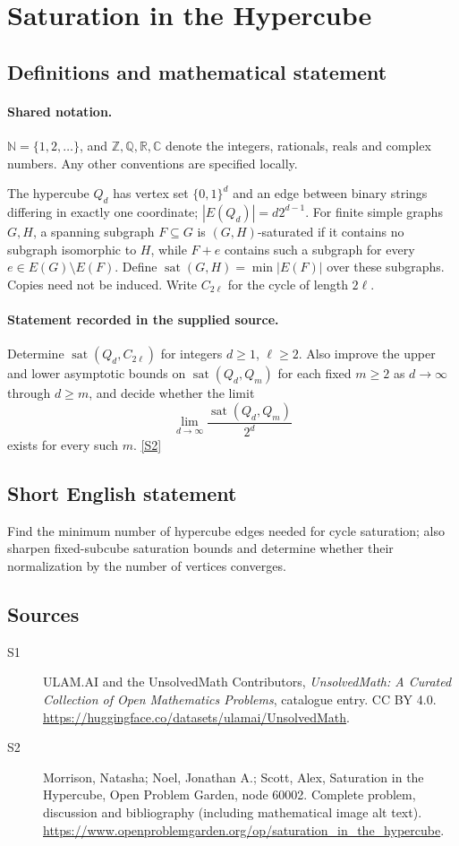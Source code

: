 \documentclass[11pt]{book}
\newcommand{\sref}[2]{\hyperlink{source:#1:#2}{[S#2]}}
\begin{document}
\section{Saturation in the Hypercube}\label{statement}

\subsection{Definitions and mathematical statement}

\paragraph{Shared notation.}$\mathbb N=\{1,2,\ldots\}$, and $\mathbb Z,\mathbb Q,\mathbb R,\mathbb C$ denote the integers, rationals, reals and complex numbers. Any other conventions are specified locally.


The hypercube $Q_d$ has vertex set $\{0,1\}^d$ and an edge between binary strings differing in exactly one coordinate; $|E(Q_d)|=d2^{d-1}$. For finite simple graphs $G,H$, a spanning subgraph $F\subseteq G$ is $(G,H)$-saturated if it contains no subgraph isomorphic to $H$, while $F+e$ contains such a subgraph for every $e\in E(G)\setminus E(F)$. Define $\operatorname{sat}(G,H)=\min |E(F)|$ over these subgraphs. Copies need not be induced. Write $C_{2\ell}$ for the cycle of length $2\ell$.
\paragraph{Statement recorded in the supplied source.}
Determine $\operatorname{sat}(Q_d,C_{2\ell})$ for integers $d\geq1$, $\ell\geq2$. Also improve the upper and lower asymptotic bounds on $\operatorname{sat}(Q_d,Q_m)$ for each fixed $m\geq2$ as $d\to\infty$ through $d\geq m$, and decide whether the limit
\[\lim_{d\to\infty}\frac{\operatorname{sat}(Q_d,Q_m)}{2^d}\]
exists for every such $m$. \sref{statement}{2}
\subsection{Short English statement}
Find the minimum number of hypercube edges needed for cycle saturation; also sharpen fixed-subcube saturation bounds and determine whether their normalization by the number of vertices converges.
\subsection{Sources}
\begin{description}
\item[\hypertarget{source:statement:1}{S1}] ULAM.AI and the UnsolvedMath Contributors, \emph{UnsolvedMath: A Curated Collection of Open Mathematics Problems}, catalogue entry. CC BY 4.0. \url{https://huggingface.co/datasets/ulamai/UnsolvedMath}.
\item[\hypertarget{source:statement:2}{S2}] Morrison, Natasha; Noel, Jonathan A.; Scott, Alex, Saturation in the Hypercube, Open Problem Garden, node 60002. Complete problem, discussion and bibliography (including mathematical image alt text). \url{https://www.openproblemgarden.org/op/saturation_in_the_hypercube}.
\end{description}
\label{end:statement}
\end{document}
